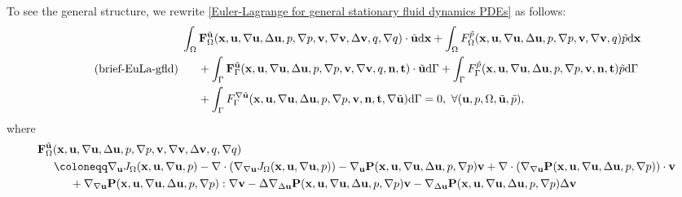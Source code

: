 \documentclass[oneside,11pt]{book}
\numberwithin{equation}{section}
\begin{document}
\begin{itemize}[leftmargin=0in]
    To see the general structure, we rewrite \eqref{Euler-Lagrange for general stationary fluid dynamics PDEs} as follows:
    \begin{equation}
        \label{brief Euler-Lagrange for general stationary fluid dynamics PDEs}
        \tag{brief-EuLa-gfld}
        \left.\begin{split}
            &\int_\Omega {\bf F}_\Omega^{\tilde{\bf u}}({\bf x},{\bf u},\nabla{\bf u},\Delta{\bf u},p,\nabla p,{\bf v},\nabla{\bf v},\Delta{\bf v},q,\nabla q)\cdot\tilde{\bf u}{\rm d}{\bf x} + \int_\Omega F_\Omega^{\tilde{p}}({\bf x},{\bf u},\nabla{\bf u},\Delta{\bf u},p,\nabla p,{\bf v},\nabla{\bf v},q)\tilde{p}{\rm d}{\bf x}\\
            &\hspace{5mm}+ \int_\Gamma {\bf F}_\Gamma^{\tilde{\bf u}}({\bf x},{\bf u},\nabla{\bf u},\Delta{\bf u},p,\nabla p,{\bf v},\nabla{\bf v},q,{\bf n},{\bf t})\cdot\tilde{\bf u}{\rm d}\Gamma + \int_\Gamma F_\Gamma^{\tilde{p}}({\bf x},{\bf u},\nabla{\bf u},\Delta{\bf u},p,\nabla p,{\bf v},{\bf n},{\bf t})\tilde{p}{\rm d}\Gamma\\
            &\hspace{5mm}+ \int_\Gamma F_\Gamma^{\nabla\tilde{\bf u}}({\bf x},{\bf u},\nabla{\bf u},\Delta{\bf u},p,\nabla p,{\bf v},{\bf n},{\bf t},\nabla\tilde{\bf u}){\rm d}\Gamma = 0,\ \forall({\bf u},p,\Omega,\tilde{\bf u},\tilde{p}),
        \end{split}\right.
    \end{equation}
    where
    \begin{align*}
        &{\bf F}_\Omega^{\tilde{\bf u}}({\bf x},{\bf u},\nabla{\bf u},\Delta{\bf u},p,\nabla p,{\bf v},\nabla{\bf v},\Delta{\bf v},q,\nabla q)\\
        &\hspace{5mm}\coloneqq\nabla_{\bf u}J_\Omega({\bf x},{\bf u},\nabla{\bf u},p) - \nabla\cdot\left(\nabla_{\nabla{\bf u}}J_\Omega({\bf x},{\bf u},\nabla{\bf u},p)\right) - \nabla_{\bf u}{\bf P}({\bf x},{\bf u},\nabla{\bf u},\Delta{\bf u},p,\nabla p){\bf v} + \nabla\cdot\left(\nabla_{\nabla{\bf u}}{\bf P}({\bf x},{\bf u},\nabla{\bf u},\Delta{\bf u},p,\nabla p)\right)\cdot{\bf v}\\
        &\hspace{1cm}+ \nabla_{\nabla{\bf u}}{\bf P}({\bf x},{\bf u},\nabla{\bf u},\Delta{\bf u},p,\nabla p):\nabla{\bf v} - \Delta\nabla_{\Delta{\bf u}}{\bf P}({\bf x},{\bf u},\nabla{\bf u},\Delta{\bf u},p,\nabla p){\bf v} - \nabla_{\Delta{\bf u}}{\bf P}({\bf x},{\bf u},\nabla{\bf u},\Delta{\bf u},p,\nabla p)\Delta{\bf v}\\

\end{align*}
\end{itemize}
\end{document}
